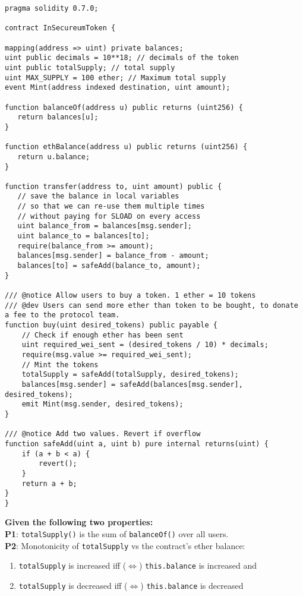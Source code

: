 \begin{lstlisting}[language=Solidity, style=solStyle]
pragma solidity 0.7.0;

contract InSecureumToken {

mapping(address => uint) private balances;
uint public decimals = 10**18; // decimals of the token
uint public totalSupply; // total supply
uint MAX_SUPPLY = 100 ether; // Maximum total supply
event Mint(address indexed destination, uint amount);

function balanceOf(address u) public returns (uint256) {
   return balances[u];
}

function ethBalance(address u) public returns (uint256) {
   return u.balance;
}

function transfer(address to, uint amount) public {
   // save the balance in local variables
   // so that we can re-use them multiple times
   // without paying for SLOAD on every access
   uint balance_from = balances[msg.sender];
   uint balance_to = balances[to];
   require(balance_from >= amount);
   balances[msg.sender] = balance_from - amount;
   balances[to] = safeAdd(balance_to, amount);
}

/// @notice Allow users to buy a token. 1 ether = 10 tokens
/// @dev Users can send more ether than token to be bought, to donate a fee to the protocol team.
function buy(uint desired_tokens) public payable {
    // Check if enough ether has been sent
    uint required_wei_sent = (desired_tokens / 10) * decimals;
    require(msg.value >= required_wei_sent);
    // Mint the tokens
    totalSupply = safeAdd(totalSupply, desired_tokens);
    balances[msg.sender] = safeAdd(balances[msg.sender], desired_tokens);
    emit Mint(msg.sender, desired_tokens);
}

/// @notice Add two values. Revert if overflow
function safeAdd(uint a, uint b) pure internal returns(uint) {
    if (a + b < a) {
        revert();
    }
    return a + b;
}
}
\end{lstlisting}

\textbf{Given the following two properties:}\\
\textbf{P1}: \verb|totalSupply()| is the sum of \verb|balanceOf()| over all users.\\
\textbf{P2}: Monotonicity of \verb|totalSupply| vs the contract's ether balance:
\begin{enumerate}[label=(\alph*)]
    \item\verb|totalSupply| is increased iff ($\Leftrightarrow$) \verb|this.balance| is increased and
    \item\verb|totalSupply| is decreased iff ($\Leftrightarrow$) \verb|this.balance| is decreased
\end{enumerate}

